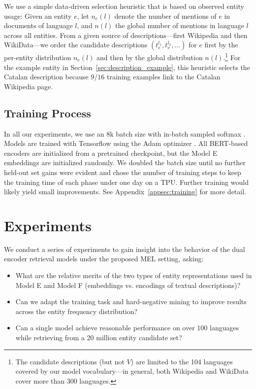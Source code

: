 \documentclass[11pt,a4paper]{article}
\begin{document}
We use a simple data-driven selection heuristic that is based on observed entity usage:
Given an entity $e$,
let $n_e(l)$ denote the number of mentions of $e$ in documents of language $l$,
and $n(l)$ the global number of mentions in language $l$ across all entities.
From a given source of descriptions---first Wikipedia and then WikiData---we order the candidate descriptions $(t_e^{l_1},t_e^{l_2},\dots )$ for  $e$ first by the per-entity distribution $n_e(l)$ and then by the global distribution $n(l)$.\footnote{The candidate descriptions (but not $V$) are limited to the 104 languages covered by our model vocabulary---in general, both Wikipedia and WikiData cover more than 300 languages.} For the example entity in Section~\ref{sec:description_example}, this heuristic selects the Catalan description because $9/16$ training examples link to the Catalan Wikipedia page.

\subsection{Training Process}
In all our experiments, we use an 8k batch size with in-batch sampled softmax \citep{gillick2018end}.
Models are trained with Tensorflow \citep{abadi2016tensorflow} using the Adam optimizer \cite{kingma2015adam,Loshchilov2019DecoupledWD}.
All BERT-based encoders are initialized from a pretrained checkpoint, but the Model E embeddings are initialized randomly.
We doubled the batch size until no further held-out set gains were evident and chose the number of training steps to keep the training time of each phase under one day on a TPU. Further training would likely yield small improvements.
See Appendix~\ref{appsec:training} for more detail.

\section{Experiments}
We conduct a series of experiments to gain insight into the behavior of the dual encoder retrieval models under the proposed MEL setting, asking:
\begin{itemize}
\itemsep-0.2em
\item What are the relative merits of the two types of entity representations used in Model E and Model F (embeddings vs. encodings of textual descriptions)?\item Can we adapt the training task and hard-negative mining to improve results across the entity frequency distribution?
\item Can a single model achieve reasonable performance on over 100 languages while retrieving from a 20 million entity candidate set?\end{itemize}
\end{document}
